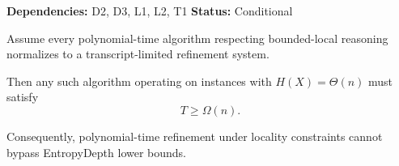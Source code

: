 \begin{theorem}
\textbf{Dependencies: } D2, D3, L1, L2, T1
\textbf{Status: } Conditional

Assume every polynomial-time algorithm respecting bounded-local reasoning
normalizes to a transcript-limited refinement system.

Then any such algorithm operating on instances with
$H(X)=\Theta(n)$ must satisfy
\[
T \ge \Omega(n).
\]

Consequently, polynomial-time refinement under locality constraints
cannot bypass EntropyDepth lower bounds.
\end{theorem}

